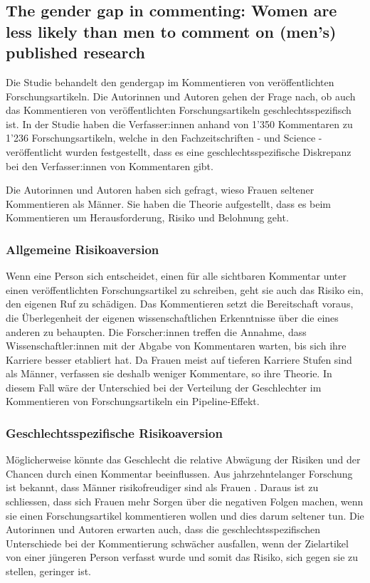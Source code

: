 \subsection{The gender gap in commenting: Women are less likely than men to comment on (men's) published research}
Die Studie  \cite{gender_gap_in_commenting} behandelt den \gls{gendergap}
im Kommentieren von veröffentlichten Forschungsartikeln. 
Die Autorinnen und Autoren gehen der Frage nach, ob auch das Kommentieren von veröffentlichten Forschungsartikeln geschlechtsspezifisch ist.
In der Studie haben die Verfasser:innen anhand von 1'350 Kommentaren zu 1'236 Forschungsartikeln, 
welche in den Fachzeitschriften -  und Science - veröffentlicht wurden festgestellt,
dass es eine geschlechtsspezifische Diskrepanz bei den Verfasser:innen von Kommentaren gibt.

Die Autorinnen und Autoren haben sich gefragt, wieso Frauen seltener Kommentieren als Männer.
Sie haben die Theorie aufgestellt, dass es beim Kommentieren um Herausforderung, Risiko und Belohnung geht.

\subsubsection{Allgemeine Risikoaversion}
Wenn eine Person sich entscheidet, einen für alle sichtbaren Kommentar unter einen veröffentlichten Forschungsartikel zu schreiben,
geht sie auch das Risiko ein, den eigenen Ruf zu schädigen.
Das Kommentieren setzt die Bereitschaft voraus, die Überlegenheit der eigenen wissenschaftlichen Erkenntnisse über die eines anderen zu behaupten.
Die Forscher:innen treffen die Annahme, dass Wissenschaftler:innen mit der Abgabe von Kommentaren warten, 
bis sich ihre Karriere besser etabliert hat.
Da Frauen meist auf tieferen Karriere Stufen sind als Männer, verfassen sie deshalb weniger Kommentare, so ihre Theorie.
In diesem Fall wäre der Unterschied bei der Verteilung der Geschlechter im Kommentieren von Forschungsartikeln ein Pipeline-Effekt.

\subsubsection{Geschlechtsspezifische Risikoaversion}
Möglicherweise könnte das Geschlecht die relative Abwägung der Risiken und der Chancen durch einen Kommentar beeinflussen.
Aus jahrzehntelanger Forschung ist bekannt, dass Männer risikofreudiger sind als Frauen 
\cite{gender_differences_in_risk_taking,gender_and_culture,self_promotion_risk_factor_for_women,gender_differences_automatic_in-group_bias,gender_differences_in_risk_assessment}. %
Daraus ist zu schliessen, dass sich Frauen mehr Sorgen über die negativen Folgen machen, wenn sie einen Forschungsartikel kommentieren wollen
und dies darum seltener tun.
Die Autorinnen und Autoren erwarten auch, dass die geschlechtsspezifischen Unterschiede bei der Kommentierung schwächer ausfallen, 
wenn der Zielartikel von einer jüngeren Person verfasst wurde und somit das Risiko, sich gegen sie zu stellen, geringer ist.

